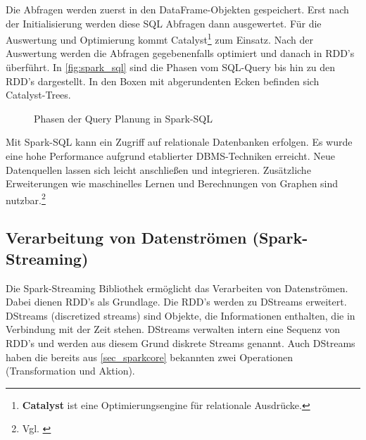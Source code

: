 \noindent
Die Abfragen werden zuerst in den DataFrame-Objekten gespeichert. Erst nach der Initialisierung werden diese SQL Abfragen dann ausgewertet. Für die Auswertung und Optimierung kommt Catalyst\footnote{\textbf{Catalyst} ist eine Optimierungsengine für relationale Ausdrücke.} zum Einsatz. Nach der Auswertung werden die Abfragen gegebenenfalls optimiert und danach in RDD's überführt. In \autoref{fig:spark_sql} sind die Phasen vom SQL-Query bis hin zu den RDD's dargestellt. In den Boxen mit abgerundenten Ecken befinden sich Catalyst-Trees.

\begin{figure}[h]
  \centering
  \caption{Phasen der Query Planung in Spark-SQL \cite{AXL+15}}\label{fig:spark_sql}
\end{figure}

\noindent
Mit Spark-SQL kann ein Zugriff auf relationale Datenbanken erfolgen. Es wurde eine hohe Performance aufgrund etablierter DBMS-Techniken erreicht.
Neue Datenquellen lassen sich leicht anschließen und integrieren.
Zusätzliche Erweiterungen wie maschinelles Lernen und Berechnungen von Graphen sind nutzbar.\footnote{Vgl. \cite{AXL+15}} \\







\newpage
\subsection{Verarbeitung von Datenströmen (Spark-Streaming)}


Die Spark-Streaming Bibliothek ermöglicht das Verarbeiten von Datenströmen. Dabei dienen RDD's als Grundlage. Die RDD's werden zu DStreams erweitert. DStreams (discretized streams) sind Objekte, die Informationen enthalten, die in Verbindung mit der Zeit stehen. DStreams verwalten intern eine Sequenz von RDD's und werden aus diesem Grund diskrete Streams genannt.
Auch DStreams haben die bereits aus \ref{sec_sparkcore} bekannten zwei Operationen (Transformation und Aktion). \\

